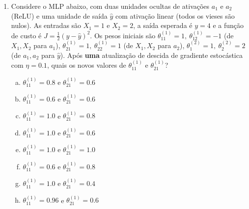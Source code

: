\documentclass{dlproblemset}
\begin{document}
\begin{enumerate}[1)]
    \item Considere o MLP abaixo, com duas unidades ocultas de ativações $a_1$ e $a_2$ (ReLU) e uma unidade de saída $\hat{y}$ com ativação linear (todos os vieses são nulos). As entradas são $X_1 = 1$ e $X_2 = 2$, a saída esperada é $y = 4$ e a função de custo é $J = \tfrac{1}{2}(y - \hat{y})^2$. Os pesos iniciais são
    $\theta^{(1)}_{11} = 1,\ \theta^{(1)}_{12} = -1$ (de $X_1, X_2$ para $a_1$),
    $\theta^{(1)}_{21} = 1,\ \theta^{(1)}_{22} = 1$ (de $X_1, X_2$ para $a_2$),
    $\theta^{(2)}_{1} = 1,\ \theta^{(2)}_{2} = 2$ (de $a_1, a_2$ para $\hat{y}$).
    Após \textbf{uma} atualização de descida de gradiente estocástica com $\eta = 0.1$, quais os novos valores de $\theta^{(1)}_{11}$ e $\theta^{(1)}_{21}$?

    \begin{center}
    \end{center}

    \begin{enumerate}[(a)]
        \item $\theta^{(1)}_{11} = 0.8$ \quad e \quad $\theta^{(1)}_{21} = 0.6$
        \item $\theta^{(1)}_{11} = 0.6$ \quad e \quad $\theta^{(1)}_{21} = 0.6$
        \item $\theta^{(1)}_{11} = 1.0$ \quad e \quad $\theta^{(1)}_{21} = 0.8$
        \item $\theta^{(1)}_{11} = 1.0$ \quad e \quad $\theta^{(1)}_{21} = 0.6$
        \item $\theta^{(1)}_{11} = 1.0$ \quad e \quad $\theta^{(1)}_{21} = 1.0$
        \item $\theta^{(1)}_{11} = 0.6$ \quad e \quad $\theta^{(1)}_{21} = 0.8$
        \item $\theta^{(1)}_{11} = 1.0$ \quad e \quad $\theta^{(1)}_{21} = 0.4$
        \item $\theta^{(1)}_{11} = 0.96$ \quad e \quad $\theta^{(1)}_{21} = 0.6$
    \end{enumerate}


\end{enumerate}
\end{document}
